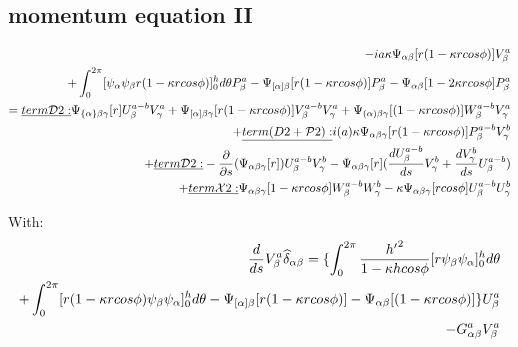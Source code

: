 \documentclass{Note}
\begin{document}
\subsection{momentum equation II}
\begin{equation}
\begin{aligned}
-ia\kappa \Psi_{\alpha\beta}[r(1-\kappa rcos\phi)]V_\beta^a\\
+\int_0^{2\pi}  [{\psi_\alpha \psi_\beta   r(1-\kappa r cos\phi)}]_0^h d\theta P_\beta^a
-\Psi_{[\alpha]\beta}[r(1-\kappa r cos\phi)]P_\beta^a-\Psi_{\alpha\beta}[1-2\kappa r cos\phi]P_\beta^a\\
=
\underline{term \mathcal{D}2:}  \Psi_{\{\alpha\}\beta\gamma} [r]U_\beta^{a-b}V_\gamma^a
+\Psi_{[\alpha]\beta\gamma} [r(1-\kappa rcos\phi)]V_\beta^{a-b}V_\gamma^a
+ \Psi_{(\alpha)\beta\gamma} [(1-\kappa rcos\phi)]W_\beta^{a-b}V_\gamma^a\\
+\underline{term\mathcal({D}2+\mathcal{P}2):}  i(a)\kappa \Psi_{\alpha\beta\gamma}[r(1-\kappa r cos\phi)]P_\beta^{a-b}V_\gamma^{b}\\
+\underline{term \mathcal{D}2:} -{{\partial }\over {\partial s}}(\Psi_{\alpha\beta\gamma}[r])U_\beta^{a-b}V_\gamma^{b}
-\Psi_{\alpha\beta\gamma}[r]({{d U_\beta^{a-b} \over {d s}}V_\gamma^{b}}+{dV_\gamma^{b}\over ds}U_\beta^{a-b})\\
+\underline{term \mathcal{X}2:}  \Psi_{\alpha\beta\gamma}[1-\kappa rcos\phi]W_\beta^{a-b}W_\gamma^b-\kappa \Psi_{\alpha\beta\gamma}[r cos\phi]U_\beta^{a-b}U_\gamma^b\\
\end{aligned}
\end{equation}


With:
\begin{equation}
\begin{aligned}
{d \over ds} V_\beta^a \widehat{\delta }_{\alpha\beta}=\{\int_0^{2\pi}{{h'}^2\over {1-\kappa h cos\phi}}[r \psi_\beta \psi_\alpha ]_0^h d\theta\\
+\int_0^{2\pi}[ r (1-\kappa r cos\phi) \psi_\beta \psi_\alpha]_0^h d\theta 
-\Psi_{[\alpha]\beta}[r(1-\kappa r cos\phi)]
-\Psi_{\alpha\beta}[(1-\kappa r cos\phi)]\}U_\beta^a\\ -G_{\alpha\beta}^a V_\beta^a\\
\end{aligned}
\end{equation}
\end{document}
